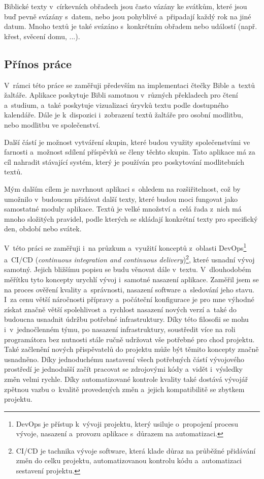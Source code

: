 \documentclass[
  tables=false,
  glossaries,
  index
]{kidiplom}
\begin{document}
Biblické texty v~církevních obřadech jsou často vázány ke svátkům, které jsou buď pevně svázány s~datem, nebo jsou pohyblivé a~připadají každý rok na jiné datum.
Mnoho textů je také svázáno s~konkrétním obřadem nebo událostí (např. křest, svěcení domu, ...).

\subsection{Přínos práce}
V~rámci této práce se zaměřuji především na implementaci čtečky Bible a~textů žaltáře. Aplikace poskytuje Bibli samotnou v~různých překladech pro čtení a~studium, a~také poskytuje vizualizaci úryvků textu podle dostupného kalendáře. Dále je k~dispozici i~zobrazení textů žaltáře pro osobní modlitbu, nebo modlitbu ve společenství.

Další částí je možnost vytváření skupin, které budou využity společenstvími ve farnosti a~možnost sdílení příspěvků se členy těchto skupin. Tato aplikace má za cíl nahradit stávající systém\cite{grekokat-casoslov}, který je používán pro poskytování modlitebních textů.

Mým dalším cílem je navrhnout aplikaci s~ohledem na rozšiřitelnost, což by umožnilo v~budoucnu přidávat další texty, které budou moci fungovat jako samostatné moduly aplikace. Textů je velké množství a~celá řada z~nich má mnoho složitých pravidel, podle kterých se skládají konkrétní texty pro specifický den, období nebo svátek.

V~této práci se zaměřuji i~na průzkum a~využití konceptů z~oblasti DevOps\footnote{DevOps je přístup k~vývoji projektu, který usiluje o~propojení procesu vývoje, nasazení a~provozu aplikace s~důrazem na automatizaci.} a~CI/CD (\emph{continuous integration and continuous delivery})\footnote{CI/CD je tachnika vývoje software, která klade důraz na průběžné přidávání změn do celku projektu, automatizovanou kontrolu kódu a~automatizaci sestavení projektu.}, které usnadní vývoj samotný. Jejich bližšímu popisu se budu věnovat dále v~textu. V~dlouhodobém měřítku tyto koncepty urychlí vývoj i~samotné nasazení aplikace. Zaměřil jsem se na proces ověření kvality a~správnosti, nasazení software a~sledování jeho stavu. I~za cenu větší náročnosti přípravy a~počáteční konfigurace je pro mne výhodné získat značně větší spolehlivost a~rychlost nasazení nových verzí a~také do budoucna usnadnit údržbu potřebné infrastruktury. Díky této filosofii se mohu i~v~jednočlenném týmu, po nasazení infrastruktury, soustředit více na roli programátora bez nutnosti stále ručně udržovat vše potřebné pro chod projektu. Také začlenění nových přispěvatelů do projektu může být těmito koncepty značně usnadněno. Díky jednoduchému nastavení všech potřebných částí vývojového prostředí je jednodušší začít pracovat se zdrojovými kódy a~vidět i~výsledky změn velmi rychle. Díky automatizované kontrole kvality také dostává vývojář zpětnou vazbu o~kvalitě provedených změn a~jejich kompatibilitě se zbytkem projektu.
\end{document}
